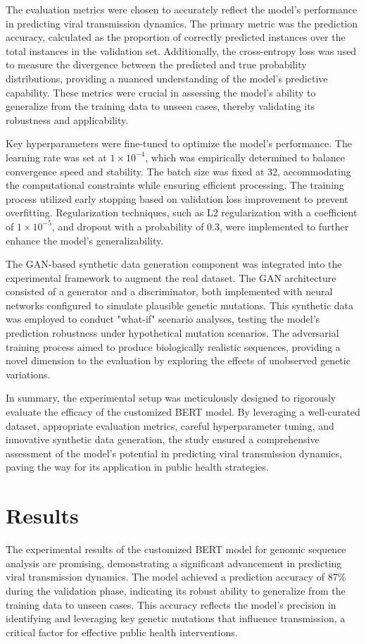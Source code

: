 \documentclass{article}
\begin{document}
The evaluation metrics were chosen to accurately reflect the model's performance in predicting viral transmission dynamics. The primary metric was the prediction accuracy, calculated as the proportion of correctly predicted instances over the total instances in the validation set. Additionally, the cross-entropy loss was used to measure the divergence between the predicted and true probability distributions, providing a nuanced understanding of the model's predictive capability. These metrics were crucial in assessing the model's ability to generalize from the training data to unseen cases, thereby validating its robustness and applicability.

Key hyperparameters were fine-tuned to optimize the model's performance. The learning rate was set at \(1 \times 10^{-4}\), which was empirically determined to balance convergence speed and stability. The batch size was fixed at 32, accommodating the computational constraints while ensuring efficient processing. The training process utilized early stopping based on validation loss improvement to prevent overfitting. Regularization techniques, such as L2 regularization with a coefficient of \(1 \times 10^{-5}\), and dropout with a probability of 0.3, were implemented to further enhance the model's generalizability.

The GAN-based synthetic data generation component was integrated into the experimental framework to augment the real dataset. The GAN architecture consisted of a generator and a discriminator, both implemented with neural networks configured to simulate plausible genetic mutations. This synthetic data was employed to conduct "what-if" scenario analyses, testing the model's prediction robustness under hypothetical mutation scenarios. The adversarial training process aimed to produce biologically realistic sequences, providing a novel dimension to the evaluation by exploring the effects of unobserved genetic variations.

In summary, the experimental setup was meticulously designed to rigorously evaluate the efficacy of the customized BERT model. By leveraging a well-curated dataset, appropriate evaluation metrics, careful hyperparameter tuning, and innovative synthetic data generation, the study ensured a comprehensive assessment of the model's potential in predicting viral transmission dynamics, paving the way for its application in public health strategies.

\section{Results}
The experimental results of the customized BERT model for genomic sequence analysis are promising, demonstrating a significant advancement in predicting viral transmission dynamics. The model achieved a prediction accuracy of 87\% during the validation phase, indicating its robust ability to generalize from the training data to unseen cases. This accuracy reflects the model's precision in identifying and leveraging key genetic mutations that influence transmission, a critical factor for effective public health interventions.
\end{document}
